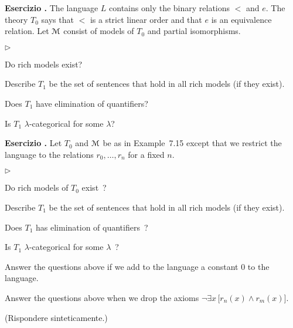\documentclass[10pt]{article}
\def\M{\EuScript M}
\def\E{\exists}
\newcommand{\labella}[1]{{\sf\footnotesize #1}\hfill}
\renewenvironment{itemize}
  {\begin{list}{$\triangleright$}{%
   \setlength{\parskip}{0mm}
   \setlength{\topsep}{0mm}
   \setlength{\rightmargin}{0mm}
   \setlength{\listparindent}{0mm}
   \setlength{\itemindent}{0mm}
   \setlength{\labelwidth}{3ex}
   \setlength{\itemsep}{0mm}
   \setlength{\parsep}{0mm}
   \setlength{\partopsep}{0mm}
   \setlength{\labelsep}{1ex}
   \setlength{\leftmargin}{\labelwidth+\labelsep}
   \let\makelabel\labella}}{%
   \end{list}}
\newcounter{ex}
\newenvironment{exercise}{\clearpage\addtocounter{ex}{1}\textbf{Esercizio \theex.\quad}}{}
\begin{document}
\begin{exercise}
  The language $L$ contains only the binary relations $<$ and $e$.
  The theory $T_0$ says that $<$ is a strict linear order and that $e$ is an equivalence relation.
  Let $\M$ consist of models of $T_0$ and partial isomorphisms.
  \begin{itemize}
    \item[1.] Do rich models exist? 
    \item[2.] Describe $T_1$ be the set of sentences that hold in all rich models (if they exist).
    \item[3.] Does $T_1$ have elimination of quantifiers? 
    \item[4.] Is $T_1$ $\lambda$-categorical for some $\lambda$? 
  \end{itemize} 
\end{exercise}


\begin{exercise}
  Let $T_0$ and $\M$ be as in Example~7.15 except that we restrict the language to the relations $r_0,\dots,r_n$ for a fixed $n$.
  \begin{itemize}
  \item[1.] Do rich models of $T_0$ exist~?  
  \item[2.] Describe $T_1$ be the set of sentences that hold in all rich models (if they exist). 
  \item[3.] Does $T_1$ has elimination of quantifiers~?
  \item[4.]  Is $T_1$ $\lambda$-categorical for some $\lambda$~?  
  \end{itemize} 

  Answer the questions above if we add to the language a constant $0$ to the language.


  Answer the questions above when we drop the axioms $\neg\E x\, \big[r_n(x)\wedge r_m(x)\big]$.

  (Rispondere sinteticamente.)
\end{exercise}
\end{document}
